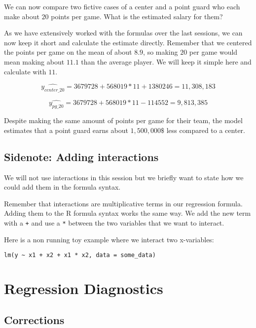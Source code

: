 \documentclass[
]{book}
\begin{document}
We can now compare two fictive cases of a center and a point guard who each make
about \(20\) points per game. What is the estimated salary for them?

As we have extensively worked with the formulas over the last sessions, we can
now keep it short and calculate the estimate directly. Remember that we
centered the points per game on the mean of about \(8.9\), so making \(20\) per game
would mean making about \(11.1\) than the average player. We will keep it simple
here and calculate with \(11\).

\[\hat{y_{center\_20}} = 3679728 + 568019 * 11 + 1380246 = 11,308,183\]

\[\hat{y_{pg\_20}} = 3679728 + 568019 * 11 - 114552 = 9,813,385\]

Despite making the same amount of points per game for their team, the model
estimates that a point guard earns about \(1,500,000\$\) less compared to a center.

\hypertarget{sidenote-adding-interactions}{%
\subsection{Sidenote: Adding interactions}\label{sidenote-adding-interactions}}

We will not use interactions in this session but we briefly want to state how we
could add them in the formula syntax.

Remember that interactions are multiplicative terms in our regression formula.
Adding them to the R formula syntax works the same way. We add the new term with
a \texttt{+} and use a \texttt{*} between the two variables that we want to interact.

Here is a non running toy example where we interact two x-variables:

\begin{verbatim}
lm(y ~ x1 + x2 + x1 * x2, data = some_data)
\end{verbatim}

\hypertarget{regression-diagnostics-1}{%
\section{Regression Diagnostics}\label{regression-diagnostics-1}}

\hypertarget{corrections}{%
\subsection{Corrections}\label{corrections}}
\end{document}
